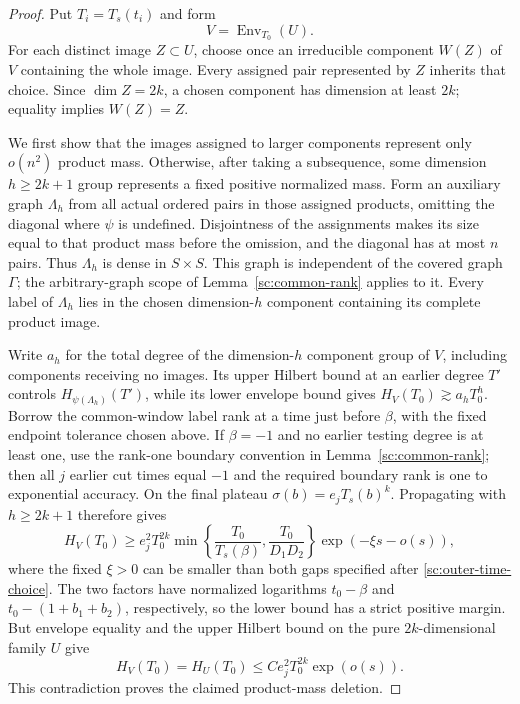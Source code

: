 \begin{proof}
Put $T_i=T_s(t_i)$ and form
\[
 V=\operatorname{Env}_{T_0}(U).
\]
For each distinct image $Z\subset U$, choose once an irreducible component
$W(Z)$ of $V$ containing the whole image.  Every assigned pair represented
by $Z$ inherits that choice.  Since $\dim Z=2k$, a chosen component has
dimension at least $2k$; equality implies $W(Z)=Z$.

We first show that the images assigned to larger components represent
only $o(n^2)$ product mass.  Otherwise, after taking a subsequence, some
dimension $h\ge2k+1$ group represents a fixed positive normalized mass.
Form an auxiliary graph $\Lambda_h$ from all actual ordered pairs in
those assigned products, omitting the diagonal where $\psi$ is undefined.
Disjointness of the assignments makes its size equal to that product
mass before the omission, and the diagonal has at most $n$ pairs.
Thus $\Lambda_h$ is dense in $S\times S$.  This graph is independent of
the covered graph $\Gamma$; the arbitrary-graph scope of
Lemma~\ref{sc:common-rank} applies to it.
Every label of $\Lambda_h$ lies in the chosen dimension-$h$ component
containing its complete product image.

Write $a_h$ for the total degree of the dimension-$h$ component group of
$V$, including components receiving no images.  Its upper Hilbert bound
at an earlier degree $T'$ controls $H_{\psi(\Lambda_h)}(T')$, while its
lower envelope bound gives $H_V(T_0)\gtrsim a_hT_0^h$.  Borrow the
common-window label rank at a time just before $\beta$, with the fixed
endpoint tolerance chosen above.  If $\beta=-1$ and no earlier testing
degree is at least one, use the rank-one boundary convention in
Lemma~\ref{sc:common-rank}; then all $j$ earlier cut times equal $-1$
and the required boundary rank is one to exponential accuracy.
On the final plateau $\sigma(b)=e_jT_s(b)^k$.  Propagating with
$h\ge2k+1$ therefore gives
\[
 H_V(T_0)\ge e_j^2T_0^{2k}
 \min\left\{\frac{T_0}{T_s(\beta)},
             \frac{T_0}{D_1D_2}\right\}
       \exp(-\xi s-o(s)),
\]
where the fixed $\xi>0$ can be smaller than both gaps specified after
\eqref{sc:outer-time-choice}.  The two factors have normalized logarithms
$t_0-\beta$ and $t_0-(1+b_1+b_2)$, respectively, so the lower bound has
a strict positive margin.  But envelope equality and the upper Hilbert
bound on the pure $2k$-dimensional family $U$ give
\[
 H_V(T_0)=H_U(T_0)\le C e_j^2T_0^{2k}\exp(o(s)).
\]
This contradiction proves the claimed product-mass deletion.


\end{proof}
